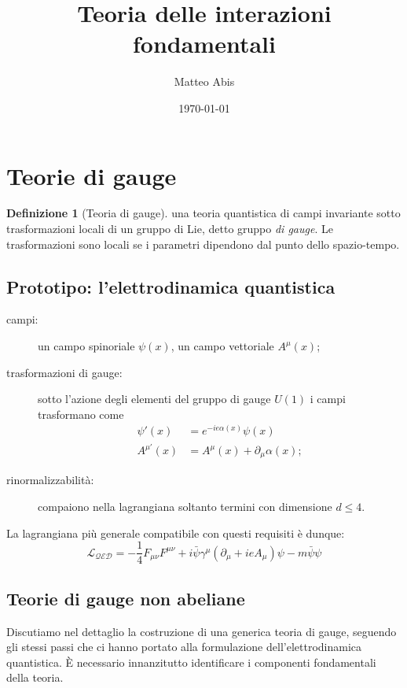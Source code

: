\documentclass[italian,a4paper]{article}
\title{Teoria delle interazioni fondamentali}
\author{Matteo Abis}
\date{\today}
\theoremstyle{definition}
\newtheorem*{definition}{Definizione}
\newcommand{\dimu}{\ensuremath{\partial_{\mu}}}
\renewcommand{\leq}{\leqslant}
\begin{document}
\maketitle

\section{Teorie di gauge}
\begin{definition}[Teoria di gauge] una teoria quantistica di campi
    invariante sotto trasformazioni locali di un gruppo di Lie, detto gruppo
    \emph{di gauge}. Le trasformazioni sono locali se i parametri dipendono
    dal punto dello spazio-tempo.
\end{definition}

\subsection{Prototipo: l'elettrodinamica quantistica}
\begin{description}
    \item[campi:] un campo spinoriale $\psi(x)$, un campo vettoriale
        $A^{\mu}(x)$;
    \item[trasformazioni di gauge:] sotto l'azione degli elementi del gruppo
        di gauge $U(1)$ i campi trasformano come
        \begin{align*}
            \psi'(x) &= e^{-ie\alpha(x)}\psi(x)\\
            A^{\mu'}(x) &= A^{\mu}(x) + \dimu \alpha(x);
        \end{align*}
    \item[rinormalizzabilit\`a:] compaiono nella lagrangiana soltanto
        termini con dimensione $d \leq 4$.
\end{description}

La lagrangiana pi\`u generale compatibile con questi requisiti \`e dunque:
\begin{equation*}
    \mathscr{L_{\text{QED}}} = -\dfrac{1}{4}F_{\mu\nu}F^{\mu\nu} + i
    \bar{\psi}\gamma^{\mu}(\dimu + i e A_{\mu})\psi - m
    \bar{\psi}\psi
\end{equation*}

\subsection{Teorie di gauge non abeliane}
Discutiamo nel dettaglio la costruzione di una generica teoria di gauge,
seguendo gli stessi passi che ci hanno portato alla formulazione
dell'elettrodinamica quantistica. \`E necessario innanzitutto identificare i
componenti fondamentali della teoria.
\end{document}
